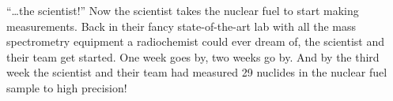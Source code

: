 {{\begin{minipage}[t]{0.45\textwidth}
    ``\ldots the scientist!'' Now the scientist takes the nuclear fuel to start
    making measurements. Back in their fancy state-of-the-art lab with all the
    mass spectrometry equipment a radiochemist could ever dream of, the
    scientist and their team get started. One week goes by, two weeks go by.
    And by the third week the scientist and their team had measured 29 nuclides
    in the nuclear fuel sample to high precision! 

  \end{minipage}
}

\noindent {}}
